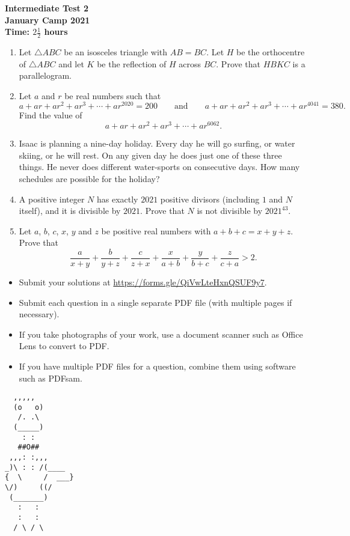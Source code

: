 \documentclass{article}
\begin{document}
\thispagestyle{empty}

\begin{center}
  \textbf{\Large Intermediate Test 2}
  \\ \vspace{1em}
  \textbf{\large January Camp 2021}
  \\ \vspace{1em}
  \textbf{\large Time: $2\frac{1}{2}$ hours}
\end{center}

\vspace{24pt}

\begin{enumerate}[1.]

\item %
Let $\triangle ABC$ be an isosceles triangle with $AB = BC$. Let $H$ be the orthocentre of $\triangle ABC$ and let $K$ be the reflection of $H$ across $BC$. Prove that $HBKC$ is a parallelogram.


\item %
Let $a$ and $r$ be real numbers such that
\[ a +ar +ar^2 +ar^3 +\dotsb +ar^{2020} = 200 \qquad\text{and}\qquad a +ar +ar^2 +ar^3 +\dotsb +ar^{4041} = 380. \]
Find the value of
\[ a +ar +ar^2 +ar^3 +\dotsb +ar^{6062}. \]


\item %
Isaac is planning a nine-day holiday. Every day he will go surfing, or water skiing, or he will rest. On any given day he does just one of these three things. He never does different water-sports on consecutive days. How many schedules are possible for the holiday?

\item %
A positive integer $N$ has exactly $2021$ positive divisors (including $1$ and $N$ itself), and it is divisible by $2021$.
Prove that $N$ is not divisible by $2021^{43}$.


\item %
Let $a$, $b$, $c$, $x$, $y$ and $z$ be positive real numbers with $a + b + c = x + y + z$.
Prove that 
\[ \frac{a}{x + y} + \frac{b}{y + z} + \frac{c}{z + x} + \frac{x}{a + b} + \frac{y}{b + c} + \frac{z}{c + a} > 2. \]


\end{enumerate}


\vfill
\begin{itemize}
	\item Submit your solutions at \url{https://forms.gle/QiVwLteHxnQSUF9y7}.
	\item Submit each question in a single separate PDF file (with multiple pages if necessary).
	\item If you take photographs of your work, use a document scanner such as Office Lens to convert to PDF.
	\item If you have multiple PDF files for a question, combine them using software such as PDFsam.
\end{itemize}

\vfill
\centering
\begin{BVerbatim}
  ,,,,,
  (o   o)
   /. .\ 
  (_____)
    : :
   ##O##
 ,,,: :,,,
_)\ : : /(____
{  \     /  ___}
\/)     ((/
 (_______)
   :   :
   :   :
  / \ / \
\end{BVerbatim}
\end{document}
